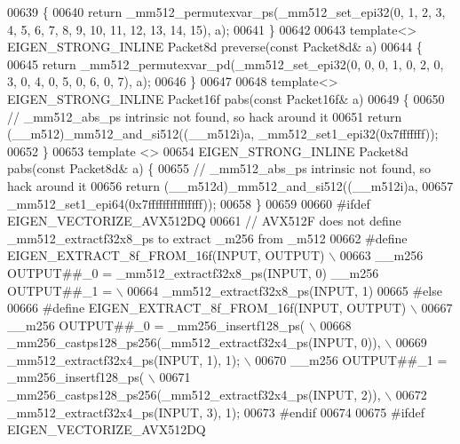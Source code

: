\begin{DoxyCode}
00639 \{
00640   \textcolor{keywordflow}{return} \_mm512\_permutexvar\_ps(\_mm512\_set\_epi32(0, 1, 2, 3, 4, 5, 6, 7, 8, 9, 10, 11, 12, 13, 14, 15), a);
00641 \}
00642 
00643 \textcolor{keyword}{template}<> EIGEN\_STRONG\_INLINE Packet8d preverse(\textcolor{keyword}{const} Packet8d& a)
00644 \{
00645   \textcolor{keywordflow}{return} \_mm512\_permutexvar\_pd(\_mm512\_set\_epi32(0, 0, 0, 1, 0, 2, 0, 3, 0, 4, 0, 5, 0, 6, 0, 7), a);
00646 \}
00647 
00648 \textcolor{keyword}{template}<> EIGEN\_STRONG\_INLINE Packet16f pabs(\textcolor{keyword}{const} Packet16f& a)
00649 \{
00650   \textcolor{comment}{// \_mm512\_abs\_ps intrinsic not found, so hack around it}
00651   \textcolor{keywordflow}{return} (\_\_m512)\_mm512\_and\_si512((\_\_m512i)a, \_mm512\_set1\_epi32(0x7fffffff));
00652 \}
00653 \textcolor{keyword}{template} <>
00654 EIGEN\_STRONG\_INLINE Packet8d pabs(\textcolor{keyword}{const} Packet8d& a) \{
00655   \textcolor{comment}{// \_mm512\_abs\_ps intrinsic not found, so hack around it}
00656   \textcolor{keywordflow}{return} (\_\_m512d)\_mm512\_and\_si512((\_\_m512i)a,
00657                                    \_mm512\_set1\_epi64(0x7fffffffffffffff));
00658 \}
00659 
00660 \textcolor{preprocessor}{#ifdef EIGEN\_VECTORIZE\_AVX512DQ}
00661 \textcolor{comment}{// AVX512F does not define \_mm512\_extractf32x8\_ps to extract \_m256 from \_m512}
00662 \textcolor{preprocessor}{#define EIGEN\_EXTRACT\_8f\_FROM\_16f(INPUT, OUTPUT)                           \(\backslash\)}
00663 \textcolor{preprocessor}{  \_\_m256 OUTPUT##\_0 = \_mm512\_extractf32x8\_ps(INPUT, 0) \_\_m256 OUTPUT##\_1 = \(\backslash\)}
00664 \textcolor{preprocessor}{      \_mm512\_extractf32x8\_ps(INPUT, 1)}
00665 \textcolor{preprocessor}{#else}
00666 \textcolor{preprocessor}{#define EIGEN\_EXTRACT\_8f\_FROM\_16f(INPUT, OUTPUT)                \(\backslash\)}
00667 \textcolor{preprocessor}{  \_\_m256 OUTPUT##\_0 = \_mm256\_insertf128\_ps(                     \(\backslash\)}
00668 \textcolor{preprocessor}{      \_mm256\_castps128\_ps256(\_mm512\_extractf32x4\_ps(INPUT, 0)), \(\backslash\)}
00669 \textcolor{preprocessor}{      \_mm512\_extractf32x4\_ps(INPUT, 1), 1);                     \(\backslash\)}
00670 \textcolor{preprocessor}{  \_\_m256 OUTPUT##\_1 = \_mm256\_insertf128\_ps(                     \(\backslash\)}
00671 \textcolor{preprocessor}{      \_mm256\_castps128\_ps256(\_mm512\_extractf32x4\_ps(INPUT, 2)), \(\backslash\)}
00672 \textcolor{preprocessor}{      \_mm512\_extractf32x4\_ps(INPUT, 3), 1);}
00673 \textcolor{preprocessor}{#endif}
00674 
00675 \textcolor{preprocessor}{#ifdef EIGEN\_VECTORIZE\_AVX512DQ}

\end{DoxyCode}
